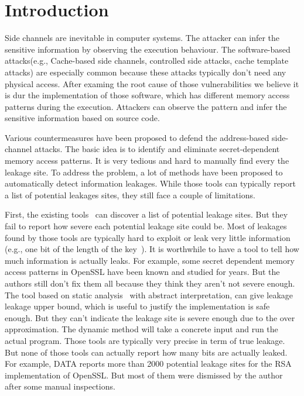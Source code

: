 \section{Introduction}

Side channels are inevitable in computer systems. The attacker can infer the sensitive 
information by observing the execution behaviour. The software-based attacks(e.g., Cache-based 
side channels, controlled side attacks, cache template attacks) are especially common 
because these attacks typically don’t need any physical access. 
After examing the root cause of those vulnerabilities we believe it is dur the implementation 
of those software, which has different memory access patterns during the execution. 
Attackers can observe the pattern and infer the sensitive information based on source code.

Various countermeasures have been proposed to defend the address-based side-channel attacks. 
The basic idea is to identify and eliminate secret-dependent memory access patterns. 
It is very tedious and hard to manually find every the leakage site. To address the problem, 
a lot of methods have been proposed to automatically detect information leakages. 
While those tools can typically report a list of potential leakages sites, they still 
face a couple of limitations.

First, the existing tools~\cite{203878, 217537} can discover a list of potential leakage sites. 
But they fail to report how severe each potential leakage site could be. Most of leakages 
found by those tools are typically hard to exploit or leak very little information (e.g., one bit of
the length of the key~\cite{203878}).  
It is worthwhile to have a tool to tell how much information is actually leaks. 
For example, some secret dependent memory access patterns in OpenSSL have been known 
and studied for years. But the authors still don't fix them all because they think 
they aren’t not severe enough. The tool based on static analysis~\cite{182946} with 
abstract interpretation, can give leakage leakage upper bound, which is useful to 
justify the implementation is safe enough. But they can’t indicate the leakage site 
is severe enough due to the over approximation. The dynamic method will take a concrete 
input and run the actual program. 
Those tools are typically very precise in term of true leakage. But none of those tools 
can actually report how many bits are actually leaked. For example, DATA\cite{217537} reports more 
than 2000 potential leakage sites for the RSA implementation of OpenSSL. But most of 
them were dismissed by the author after some manual inspections.

